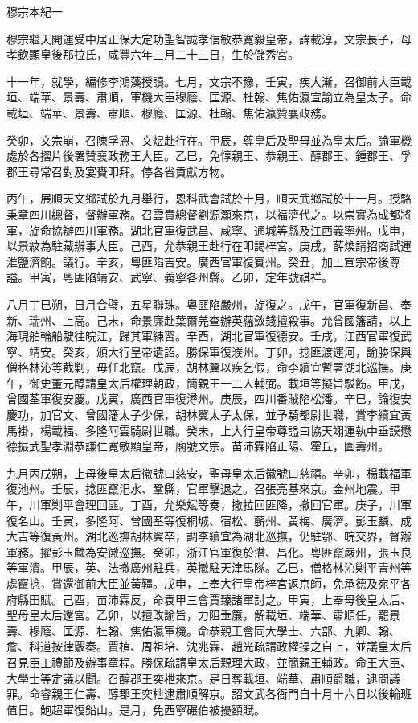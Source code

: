 
\begin{pinyinscope}
穆宗本紀一

穆宗繼天開運受中居正保大定功聖智誠孝信敏恭寬毅皇帝，諱載淳，文宗長子，母孝欽顯皇後那拉氏，咸豐六年三月二十三日，生於儲秀宮。

十一年，就學，編修李鴻藻授讀。七月，文宗不豫，壬寅，疾大漸，召御前大臣載垣、端華、景壽、肅順，軍機大臣穆廕、匡源、杜翰、焦佑瀛宣諭立為皇太子。命載垣、端華、景壽、肅順、穆廕、匡源、杜翰、焦佑瀛贊襄政務。

癸卯，文宗崩，召陳孚恩、文煜赴行在。甲辰，尊皇后及聖母並為皇太后。諭軍機處於各摺片後署贊襄政務王大臣。乙巳，免惇親王、恭親王、醇郡王、鍾郡王、孚郡王尋常召對及宴賚叩拜。停各省貢獻方物。

丙午，展順天文鄉試於九月舉行，恩科武會試於十月，順天武鄉試於十一月。授駱秉章四川總督，督辦軍務。召雲貴總督劉源灝來京，以福濟代之。以崇實為成都將軍，旋命協辦四川軍務。湖北官軍復武昌、咸寧、通城等縣及江西義寧州。戊申，以景紋為駐藏辦事大臣。己酉，允恭親王赴行在叩謁梓宮。庚戌，薛煥請招商試運淮鹽濟餉。議行。辛亥，粵匪陷吉安。廣西官軍復賓州。癸丑，加上宣宗帝後尊謚。甲寅，粵匪陷靖安、武寧、義寧各州縣。乙卯，定年號祺祥。

八月丁巳朔，日月合璧，五星聯珠。粵匪陷嚴州，旋復之。戊午，官軍復新昌、奉新、瑞州、上高。己未，命景廉赴葉爾羌查辦英蘊斂錢擅殺事。允曾國籓請，以上海現舶輪船駛往皖江，歸其軍練習。辛酉，湖北官軍復德安。壬戌，江西官軍復武寧、靖安。癸亥，頒大行皇帝遺詔。勝保軍復濮州。丁卯，捻匪渡運河，諭勝保與僧格林沁等截剿，毋任北竄。戊辰，胡林翼以疾乞假，命李續宜暫署湖北巡撫。庚午，御史董元醇請皇太后權理朝政，簡親王一二人輔弼。載垣等擬旨駁飭。甲戌，曾國荃軍復安慶。戊寅，廣西官軍復潯州。庚辰，四川番賊陷松潘。辛巳，論復安慶功，加官文、曾國籓太子少保，胡林翼太子太保，並予騎都尉世職，賞李續宜黃馬褂，楊載福、多隆阿雲騎尉世職。癸未，上大行皇帝尊謚曰協天翊運執中垂謨懋德振武聖孝淵恭謙仁寬敏顯皇帝，廟號文宗。苗沛霖陷正陽、霍丘，圍壽州。

九月丙戌朔，上母後皇太后徽號曰慈安，聖母皇太后徽號曰慈禧。辛卯，楊載福軍復池州。壬辰，捻匪竄汜水、鞏縣，官軍擊退之。召張亮基來京。金州地震。甲午，川軍剿平會理回匪。丁酉，允樂斌等奏，撒拉回匪降，撤回官軍。庚子，川軍復名山。壬寅，多隆阿、曾國荃等復桐城、宿松、蘄州、黃梅、廣濟。彭玉麟、成大吉等復黃州。湖北巡撫胡林翼卒，調李續宜為湖北巡撫，仍駐鄂、皖交界，督辦軍務。擢彭玉麟為安徽巡撫。癸卯，浙江官軍復於潛、昌化。粵匪竄嚴州，張玉良等軍潰。甲辰，英、法撤廣州駐兵，英撤駐天津馬隊。乙巳，僧格林沁剿平青州等處竄捻，賞還御前大臣並黃韁。戊申，上奉大行皇帝梓宮返京師，免承德及宛平各府縣田賦。己酉，苗沛霖反，命袁甲三會賈臻諸軍討之。甲寅，上奉母後皇太后、聖母皇太后還宮。乙卯，以擅改諭旨，力阻垂簾，解載垣、端華、肅順任，罷景壽、穆廕、匡源、杜翰、焦佑瀛軍機。命恭親王會同大學士、六部、九卿、翰、詹、科道按律覈奏。賈楨、周祖培、沈兆霖、趙光疏請政權操之自上，並議皇太后召見臣工禮節及辦事章程。勝保疏請皇太后親理大政，並簡親王輔政。命王大臣、大學士等定議以聞。召醇郡王奕枻來京。是日奪載垣、端華、肅順爵職，逮問議罪。命睿親王仁壽、醇郡王奕枻逮肅順解京。詔文武各衙門自十月十六日以後輪班值日。鮑超軍復鉛山。是月，免西寧碾伯被擾額賦。


\end{pinyinscope}
